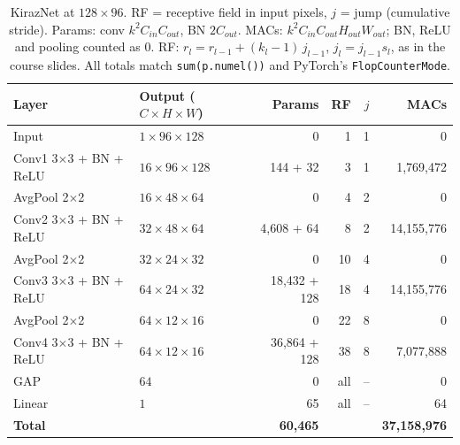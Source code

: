 \documentclass[11pt,a4paper]{article}
\newcommand{\kn}{KirazNet}
\begin{document}
\begin{table}[t]
\centering\small
\caption{\kn{} at $128\times96$. RF = receptive field in input pixels, $j$ = jump (cumulative stride).
Params: conv $k^2C_{in}C_{out}$, BN $2C_{out}$. MACs: $k^2C_{in}C_{out}H_{out}W_{out}$; BN, ReLU and
pooling counted as 0. RF: $r_l=r_{l-1}+(k_l-1)\,j_{l-1}$, $j_l=j_{l-1}s_l$, as in the course slides.
All totals match \texttt{sum(p.numel())} and PyTorch's \texttt{FlopCounterMode}.}
\label{tab:layers}
\begin{tabular}{llrrrr}
\toprule
Layer & Output ($C\times H\times W$) & Params & RF & $j$ & MACs \\
\midrule
Input & $1\times96\times128$ & 0 & 1 & 1 & 0\\
Conv1 3$\times$3 + BN + ReLU & $16\times96\times128$ & 144 + 32 & 3 & 1 & 1{,}769{,}472\\
AvgPool 2$\times$2 & $16\times48\times64$ & 0 & 4 & 2 & 0\\
Conv2 3$\times$3 + BN + ReLU & $32\times48\times64$ & 4{,}608 + 64 & 8 & 2 & 14{,}155{,}776\\
AvgPool 2$\times$2 & $32\times24\times32$ & 0 & 10 & 4 & 0\\
Conv3 3$\times$3 + BN + ReLU & $64\times24\times32$ & 18{,}432 + 128 & 18 & 4 & 14{,}155{,}776\\
AvgPool 2$\times$2 & $64\times12\times16$ & 0 & 22 & 8 & 0\\
Conv4 3$\times$3 + BN + ReLU & $64\times12\times16$ & 36{,}864 + 128 & 38 & 8 & 7{,}077{,}888\\
GAP & $64$ & 0 & all & -- & 0\\
Linear & $1$ & 65 & all & -- & 64\\
\midrule
\textbf{Total} & & \textbf{60{,}465} & & & \textbf{37{,}158{,}976}\\
\bottomrule
\end{tabular}
\end{table}
\end{document}

